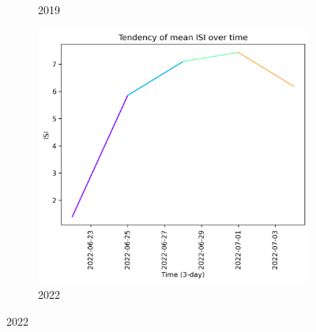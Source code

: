 \begin{figure}[h]
\begin{subfigure}{0.3\textwidth}
        \caption{2019}
        \label{fig:isi_prior_15_days_2019}
    \end{subfigure}
    \hfill
    \begin{subfigure}{0.3\textwidth}
        \centering
        \includegraphics[width=\textwidth]{graphs/2022/tendency/2022_tendency_graph_ISI.png}
        \caption{2022}
        \label{fig:isi_prior_15_days_2022}
    \end{subfigure}
    
    \label{fig:isi_values_15days_prior}
\end{figure}

